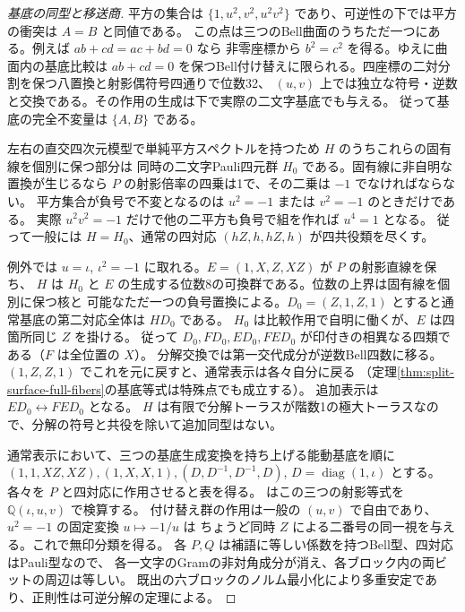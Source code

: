 \begin{proof}[基底の同型と移送商]
平方の集合は $\{1,u^2,v^2,u^2v^2\}$ であり、可逆性の下では平方の衝突は $A=B$ と同値である。
この点は三つのBell曲面のうちただ一つにある。例えば $ab+cd=ac+bd=0$ なら
非零座標から $b^2=c^2$ を得る。ゆえに曲面内の基底比較は
$ab+cd=0$ を保つBell付け替えに限られる。四座標の二対分割を保つ八置換と射影偶符号四通りで位数32、
$(u,v)$ 上では独立な符号・逆数と交換である。その作用の生成は下で実際の二文字基底でも与える。
従って基底の完全不変量は $\{A,B\}$ である。

左右の直交四次元模型で単純平方スペクトルを持つため $H$ のうちこれらの固有線を個別に保つ部分は
同時の二文字Pauli四元群 $H_0$ である。固有線に非自明な置換が生じるなら
$P$ の射影倍率の四乗は1で、その二乗は $-1$ でなければならない。
平方集合が負号で不変となるのは $u^2=-1$ または $v^2=-1$ のときだけである。
実際 $u^2v^2=-1$ だけで他の二平方も負号で組を作れば $u^4=1$ となる。
従って一般には $H=H_0$、通常の四対応 $(hZ,h,hZ,h)$ が四共役類を尽くす。

例外では $u=\iota$, $\iota^2=-1$ に取れる。$E=(1,X,Z,XZ)$ が $P$ の射影直線を保ち、
$H$ は $H_0$ と $E$ の生成する位数8の可換群である。位数の上界は固有線を個別に保つ核と
可能なただ一つの負号置換による。$D_0=(Z,1,Z,1)$ とすると通常基底の第二対応全体は $H D_0$ である。
$H_0$ は比較作用で自明に働くが、$E$ は四箇所同じ $Z$ を掛ける。
従って $D_0,FD_0,ED_0,FED_0$ が印付きの相異なる四類である（$F$ は全位置の $X$）。
分解交換では第一交代成分が逆数Bell四数に移る。
$(1,Z,Z,1)$ でこれを元に戻すと、通常表示は各々自分に戻る
（定理\ref{thm:split-surface-full-fibers}の基底等式は特殊点でも成立する）。
追加表示は $ED_0\leftrightarrow FED_0$ となる。
$H$ は有限で分解トーラスが階数1の極大トーラスなので、分解の符号と共役を除いて追加同型はない。

通常表示において、三つの基底生成変換を持ち上げる能動基底を順に
$(1,1,XZ,XZ),(1,X,X,1),(D,D^{-1},D^{-1},D)$, $D=\operatorname{diag}(1,\iota)$ とする。
各々を $P$ と四対応に作用させると表を得る。
 はこの三つの射影等式を $\mathbb Q(\iota,u,v)$ で検算する。
付け替え群の作用は一般の $(u,v)$ で自由であり、$u^2=-1$ の固定変換 $u\mapsto-1/u$ は
ちょうど同時 $Z$ による二番号の同一視を与える。これで無印分類を得る。
各 $P,Q$ は補語に等しい係数を持つBell型、四対応はPauli型なので、
各一文字のGramの非対角成分が消え、各ブロック内の両ビットの周辺は等しい。
既出の六ブロックのノルム最小化により多重安定であり、正則性は可逆分解の定理による。
\end{proof}

